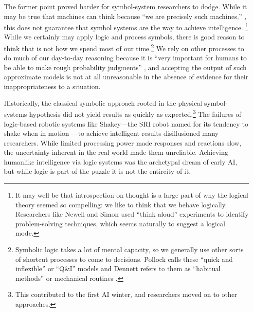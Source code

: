 


The former point proved harder for symbol-system researchers to dodge.
While it may be true that
machines can think because ``we are precisely such machines,'' \cite[p.
83]{chineseSearle}, this does not guarantee that symbol systems are
the way to achieve intelligence. \footnote{It may well be that introspection on
thought is a large part of why the logical theory seemed so
compelling:  we like to think that we behave logically. Researchers like Newell
and Simon used ``think aloud'' experiments to identify problem-solving
techniques, \cite[Ch. 10]{mccorduck} which seems naturally to suggest a
logical mode.} While we certainly may apply logic
and process symbols, there is good reason to think that is not how we
spend most of our time.\footnote{Symbolic logic takes a lot of mental capacity,
so we generally use other sorts of shortcut processes to come to
decisions. Pollock calls these ``quick and inflexible'' or ``Q\&I''
models \cite[p. 120]{pollock} and Dennett refers to them as ``habitual methods'' or
mechanical routines \cite[p. 157]{dennett}.} We rely on other processes to do
much of our day-to-day reasoning because it is ``very important for
humans to be able to make rough probability judgments'' \cite[p.
  120]{pollock}, and accepting the output of such approximate models
is not at all unreasonable in the absence of evidence for their
inappropriateness to a situation. 

Historically, the classical symbolic
approach rooted in the physical symbol-systems hypothesis did not
yield results as quickly as expected.\footnote{This contributed to 
the first AI winter, and researchers moved on to
other approaches.}
The failures of logic-based robotic systems like Shakey---the SRI
robot named for its tendency to shake when in motion \cite[Ch.
  10]{mccorduck}---to achieve intelligent results disillusioned many
researchers. While limited processing power made responses and reactions slow, the
uncertainty inherent in the real world made them unreliable. Achieving
humanlike intelligence via logic 
systems was the archetypal dream of early AI, but while logic is
part of the puzzle it is not the entireity of it.

